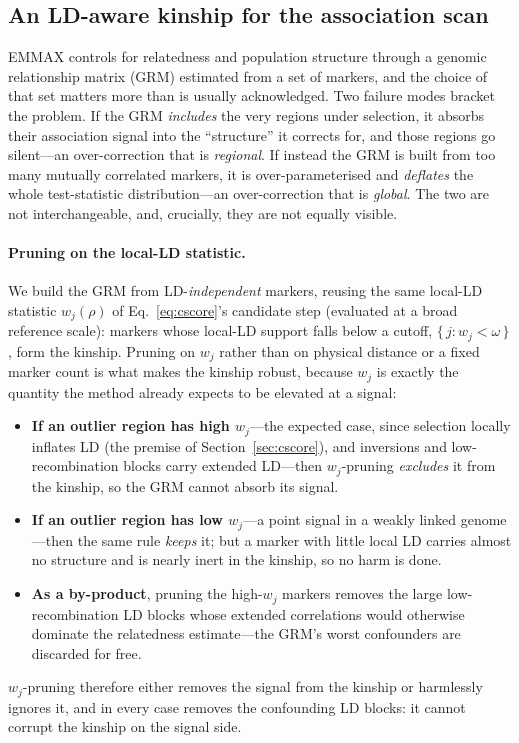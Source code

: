\documentclass[11pt]{article}
\begin{document}
\subsection{An LD-aware kinship for the association scan}
\label{sec:grm}

EMMAX controls for relatedness and population structure through a genomic
relationship matrix (GRM) estimated from a set of markers, and the choice of that
set matters more than is usually acknowledged. Two failure modes bracket the
problem. If the GRM \emph{includes} the very regions under selection, it absorbs
their association signal into the ``structure'' it corrects for, and those regions
go silent---an over-correction that is \emph{regional}. If instead the GRM is
built from too many mutually correlated markers, it is over-parameterised and
\emph{deflates} the whole test-statistic distribution---an over-correction that is
\emph{global}. The two are not interchangeable, and, crucially, they are not
equally visible.

\paragraph{Pruning on the local-LD statistic.}
We build the GRM from LD-\emph{independent} markers, reusing the same local-LD
statistic $w_j(\rho)$ of Eq.~\ref{eq:cscore}'s candidate step (evaluated at a
broad reference scale): markers whose local-LD support falls below a cutoff,
$\{\, j : w_j < \omega \,\}$, form the kinship. Pruning on $w_j$ rather than on
physical distance or a fixed marker count is what makes the kinship robust,
because $w_j$ is exactly the quantity the method already expects to be elevated
at a signal:
\begin{itemize}
  \item \textbf{If an outlier region has high $w_j$}---the expected case, since
    selection locally inflates LD (the premise of Section~\ref{sec:cscore}), and
    inversions and low-recombination blocks carry extended LD---then $w_j$-pruning
    \emph{excludes} it from the kinship, so the GRM cannot absorb its signal.
  \item \textbf{If an outlier region has low $w_j$}---a point signal in a weakly
    linked genome---then the same rule \emph{keeps} it; but a marker with little
    local LD carries almost no structure and is nearly inert in the kinship, so no
    harm is done.
  \item \textbf{As a by-product}, pruning the high-$w_j$ markers removes the large
    low-recombination LD blocks whose extended correlations would otherwise
    dominate the relatedness estimate---the GRM's worst confounders are discarded
    for free.
\end{itemize}
$w_j$-pruning therefore either removes the signal from the kinship or harmlessly
ignores it, and in every case removes the confounding LD blocks: it cannot corrupt
the kinship on the signal side.
\end{document}
